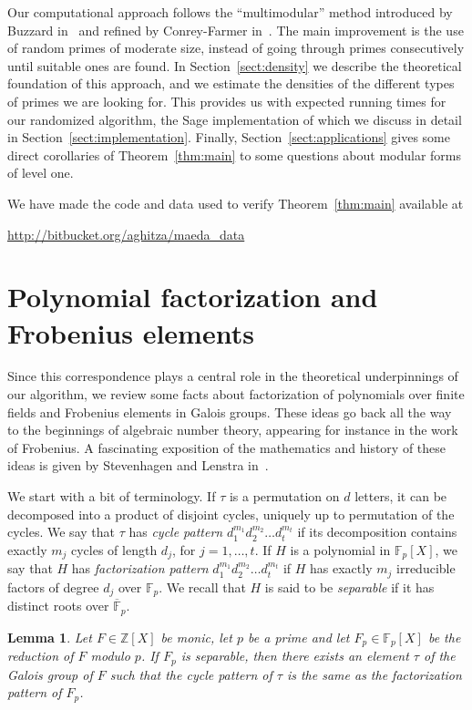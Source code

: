 \documentclass[11pt]{article}
\theoremstyle{plain}
\newtheorem{lemma}[theorem]{Lemma}
\theoremstyle{definition}
\theoremstyle{remark}
\numberwithin{equation}{section}
\newcommand{\ZZ}{\mathbb{Z}}
\newcommand{\FF}{\mathbb{F}}
\begin{document}
Our computational approach follows the ``multimodular'' method introduced by
Buzzard in~\cite{Buzzard} and refined by Conrey-Farmer in~\cite{ConreyFarmer}.
The main improvement is the use of random primes of moderate size, instead of
going through primes consecutively until suitable ones are found.  In
Section~\ref{sect:density} we describe the theoretical foundation of this
approach, and we estimate the densities of the different types of primes we
are looking for.  This provides us with expected running times for our
randomized algorithm, the Sage implementation of which we discuss in detail in
Section~\ref{sect:implementation}.  Finally, Section~\ref{sect:applications}
gives some direct corollaries of Theorem~\ref{thm:main} to some questions
about modular forms of level one.

We have made the code and data used to verify Theorem~\ref{thm:main} available
at 

\centerline{\url{http://bitbucket.org/aghitza/maeda_data}}

\section{Polynomial factorization and Frobenius elements}
\label{sect:frobenius}
Since this correspondence plays a central role in the theoretical
underpinnings of our algorithm, we review some facts about factorization of
polynomials over finite fields and Frobenius elements in Galois groups.  These
ideas go back all the way to the beginnings of algebraic number theory,
appearing for instance in the work of Frobenius.  A fascinating exposition of the
mathematics and history of these ideas is given by Stevenhagen and Lenstra
in~\cite{StevenhagenLenstra}.

We start with a bit of terminology.  If $\tau$ is a permutation on $d$ letters, 
it can be decomposed into a product of disjoint cycles, uniquely up to
permutation of the cycles.  We say that $\tau$ has \emph{cycle pattern}
$d_1^{m_1}d_2^{m_2}\ldots d_t^{m_t}$ if its decomposition contains exactly
$m_j$ cycles of length $d_j$, for $j=1,\ldots,t$.  If $H$ is a polynomial in
$\FF_p[X]$, we say that $H$ has \emph{factorization pattern}
$d_1^{m_1}d_2^{m_2}\ldots d_t^{m_t}$ if $H$ has exactly $m_j$ irreducible
factors of degree $d_j$ over $\FF_p$.  We recall that $H$ is said to be
\emph{separable} if it has distinct roots over $\overline{\FF}_p$.

\begin{lemma}
  \label{lem:frobenius}
  Let $F\in\ZZ[X]$ be monic, let $p$ be a prime and let $F_p\in\FF_p[X]$ be
  the reduction of $F$ modulo $p$.  If $F_p$ is separable, then there exists
  an element $\tau$ of the Galois group of $F$ such that the cycle pattern of
  $\tau$ is the same as the factorization pattern of $F_p$.
\end{lemma}
\end{document}
